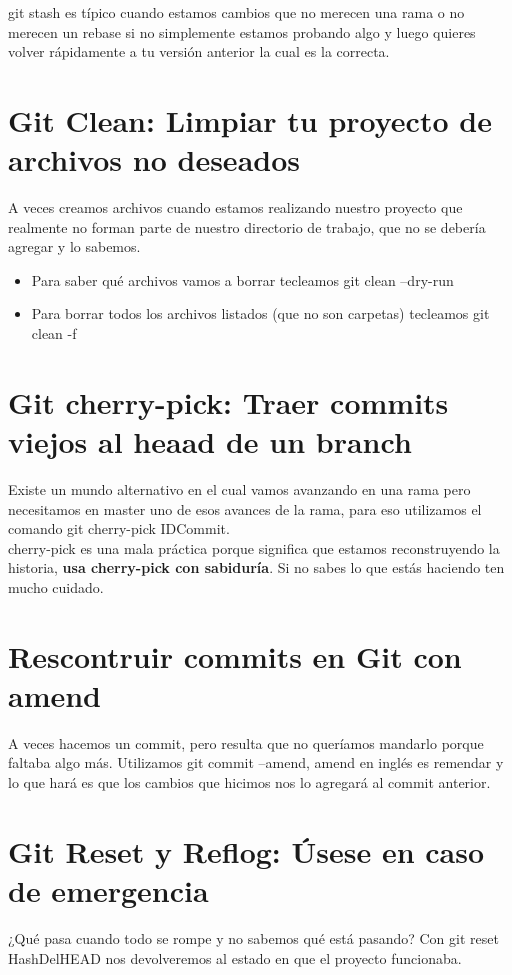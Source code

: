 \documentclass{article}
\begin{document}
git stash es típico cuando estamos cambios que no merecen una rama o no merecen
un rebase si no simplemente estamos probando algo y luego quieres volver
rápidamente a tu versión anterior la cual es la correcta.

\section{Git Clean: Limpiar tu proyecto de archivos no deseados}%
A veces creamos archivos cuando estamos realizando nuestro proyecto que
realmente no forman parte de nuestro directorio de trabajo, que no se debería
agregar y lo sabemos.\\

\begin{itemize}
  \item Para saber qué archivos vamos a borrar tecleamos git clean --dry-run
  \item Para borrar todos los archivos listados (que no son carpetas) tecleamos
    git clean -f
\end{itemize}

\section{Git cherry-pick: Traer commits viejos al heaad de un branch}%
Existe un mundo alternativo en el cual vamos avanzando en una rama pero
necesitamos en master uno de esos avances de la rama, para eso utilizamos el
comando git cherry-pick IDCommit.\\

cherry-pick es una mala práctica porque significa que estamos reconstruyendo la
historia, \textbf{usa cherry-pick con sabiduría}. Si no sabes lo que estás
haciendo ten mucho cuidado.


\section{Rescontruir commits en Git con amend}%
A veces hacemos un commit, pero resulta que no queríamos mandarlo porque
faltaba algo más. Utilizamos git commit --amend, amend en inglés es remendar y
lo que hará es que los cambios que hicimos nos lo agregará al commit
anterior.\\


\section{Git Reset y Reflog: Úsese en caso de emergencia}%
¿Qué pasa cuando todo se rompe y no sabemos qué está pasando? Con git reset
HashDelHEAD nos devolveremos al estado en que el proyecto funcionaba.\\
\end{document}
